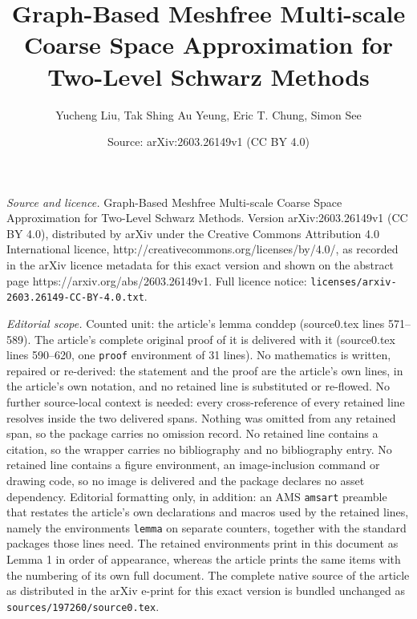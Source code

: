 \documentclass[10pt,a4paper]{amsart}
\title{Graph-Based Meshfree Multi-scale Coarse Space Approximation for Two-Level Schwarz Methods}
\author{Yucheng Liu, Tak Shing Au Yeung, Eric T. Chung, Simon See}
\date{Source: arXiv:2603.26149v1 (CC BY 4.0)}
\begin{document}
\maketitle

\noindent\emph{Source and licence.} Graph-Based Meshfree Multi-scale Coarse Space Approximation for Two-Level Schwarz Methods. Version arXiv:2603.26149v1 (CC BY 4.0), distributed by arXiv under the Creative Commons Attribution 4.0 International licence, http://creativecommons.org/licenses/by/4.0/, as recorded in the arXiv licence metadata for this exact version and shown on the abstract page https://arxiv.org/abs/2603.26149v1. Full licence notice: \texttt{licenses/arxiv-2603.26149-CC-BY-4.0.txt}.\par\smallskip

\noindent\textit{Editorial scope.} Counted unit: the article's lemma conddep (source0.tex lines 571--589). The article's complete original proof of it is delivered with it (source0.tex lines 590--620, one \texttt{proof} environment of 31 lines). No mathematics is written, repaired or re-derived: the statement and the proof are the article's own lines, in the article's own notation, and no retained line is substituted or re-flowed.  No further source-local context is needed: every cross-reference of every retained line resolves inside the two delivered spans.  Nothing was omitted from any retained span, so the package carries no omission record.  No retained line contains a citation, so the wrapper carries no bibliography and no bibliography entry.  No retained line contains a figure environment, an image-inclusion command or drawing code, so no image is delivered and the package declares no asset dependency.  Editorial formatting only, in addition: an AMS \texttt{amsart} preamble that restates the article's own declarations and macros used by the retained lines, namely the environments \texttt{lemma} on separate counters, together with the standard packages those lines need.  The retained environments print in this document as Lemma 1 in order of appearance, whereas the article prints the same items with the numbering of its own full document.  The complete native source of the article as distributed in the arXiv e-print for this exact version is bundled unchanged as \texttt{sources/197260/source0.tex}.
\end{document}
